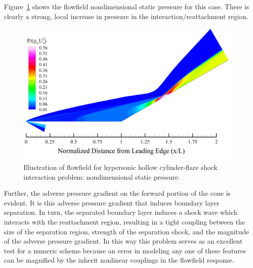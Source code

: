 \clearpage
 Figure~\ref{fig:holden_hollow_cylinder_global_P} shows the flowfield  nondimensional static pressure for this case.  There is clearly a strong, local increase in pressure in the interaction/reattachment region.  
\begin{figure}[hbtp]
  \begin{center}
    \includegraphics[width=\textwidth]{figures/holden_hollow_cylinder/P}
    \caption{Illustration of flowfield for hypersonic hollow cylinder-flare shock interaction problem: nondimensional static pressure.\label{fig:holden_hollow_cylinder_global_P}}
  \end{center}
\end{figure}
Further, the adverse pressure gradient on the forward portion of the cone is evident.  It is this adverse pressure gradient that induces boundary layer separation.  In turn, the separated boundary layer induces a shock wave which interacts with the reattachment region, resulting in a tight coupling between the size of the separation region, strength of the separation shock, and the magnitude of the adverse pressure gradient.  In this way this problem serves as an excellent test for a numeric scheme because an error in modeling any one of these features can be magnified by the inherit nonlinear couplings in the flowfield response.

